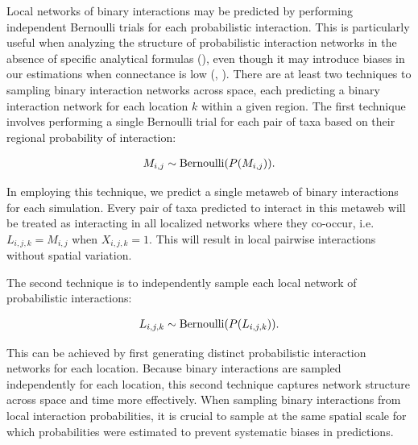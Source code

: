 \begin{box2.5}

Local networks of binary interactions may be predicted by performing independent
Bernoulli trials for each probabilistic interaction. This is particularly useful
when analyzing the structure of probabilistic interaction networks in the
absence of specific analytical formulas (\cite{Poisot2016Structure}), even
though it may introduce biases in our estimations when connectance is low
(\cite{Poisot2014When}, \cite{Chagnon2015Characterizing}). There are at least
two techniques to sampling binary interaction networks across space, each
predicting a binary interaction network for each location $k$ within a given
region. The first technique involves performing a single Bernoulli trial for
each pair of taxa based on their regional probability of interaction: 

\begin{eqnarray}
  \label{eq:sampling1}
  M_{i, j} \sim {\rm Bernoulli}(P(M_{i, j})).
\end{eqnarray}

In employing this technique, we predict a single metaweb of binary
interactions for each simulation. Every pair of taxa predicted to interact in
this metaweb will be treated as interacting in all localized networks where
they co-occur, i.e. $L_{i, j, k} = M_{i, j}$ when $X_{i,j,k} = 1$. This will
result in local pairwise interactions without spatial variation. 

The second technique is to independently sample each local network of
probabilistic interactions: 

\begin{eqnarray}
  \label{eq:sampling2}
  L_{i, j, k} \sim {\rm Bernoulli}(P(L_{i, j, k})).
\end{eqnarray}

This can be achieved by first generating distinct probabilistic interaction
networks for each location. Because binary interactions are sampled
independently for each location, this second technique captures network
structure across space and time more effectively. When sampling binary
interactions from local interaction probabilities, it is crucial to sample at
the same spatial scale for which probabilities were estimated to prevent
systematic biases in predictions.


\end{box2.5}
